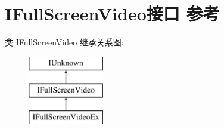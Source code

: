 \hypertarget{interface_i_full_screen_video}{}\section{I\+Full\+Screen\+Video接口 参考}
\label{interface_i_full_screen_video}
类 I\+Full\+Screen\+Video 继承关系图\+:\begin{figure}[H]
\begin{center}
\leavevmode
\includegraphics[height=3.000000cm]{interface_i_full_screen_video}
\end{center}
\end{figure}
